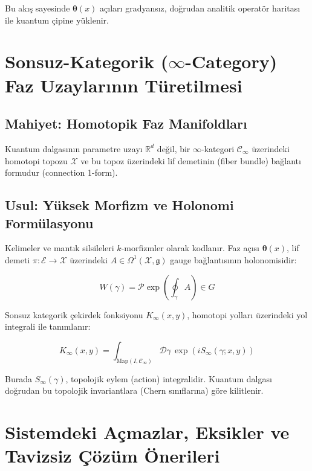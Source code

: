 \documentclass[11pt, a4paper]{article}
\begin{document}
Bu akış sayesinde $\bm{\theta}(x)$ açıları gradyansız, doğrudan analitik operatör haritası ile kuantum çipine yüklenir.

\section{Sonsuz-Kategorik ($\infty$-Category) Faz Uzaylarının Türetilmesi}

\subsection{Mahiyet: Homotopik Faz Manifoldları}
Kuantum dalgasının parametre uzayı $\mathbb{R}^d$ değil, bir $\infty$-kategori $\mathcal{C}_\infty$ üzerindeki homotopi topozu $\mathcal{X}$ ve bu topoz üzerindeki lif demetinin (fiber bundle) bağlantı formudur (connection 1-form).

\subsection{Usul: Yüksek Morfizm ve Holonomi Formülasyonu}
Kelimeler ve mantık silsileleri $k$-morfizmler olarak kodlanır. Faz açısı $\bm{\theta}(x)$, lif demeti $\pi: \mathcal{E} \to \mathcal{X}$ üzerindeki $A \in \Omega^1(\mathcal{X}, \mathfrak{g})$ gauge bağlantısının holonomisidir:

\begin{equation}
W(\gamma) = \mathcal{P} \exp \left( \oint_\gamma A \right) \in G
\end{equation}

Sonsuz kategorik çekirdek fonksiyonu $K_\infty(x, y)$, homotopi yolları üzerindeki yol integrali ile tanımlanır:

\begin{equation}
K_\infty(x, y) = \int_{\text{Map}(I, \mathcal{C}_\infty)} \mathcal{D}\gamma \, \exp\left( i S_\infty(\gamma; x, y) \right)
\end{equation}

Burada $S_\infty(\gamma)$, topolojik eylem (action) integralidir. Kuantum dalgası doğrudan bu topolojik invariantlara (Chern sınıflarına) göre kilitlenir.

\section{Sistemdeki Açmazlar, Eksikler ve Tavizsiz Çözüm Önerileri}
\end{document}
